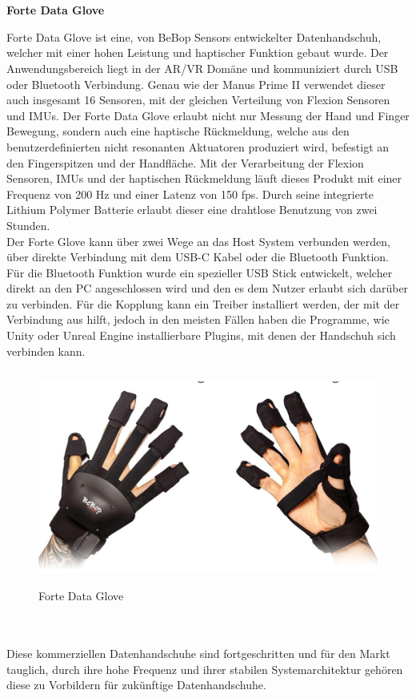 \\
\\
\begin{center}
\textbf{Forte Data Glove}
\end{center}
Forte Data Glove \parencite{web:BeBoP} ist eine, von BeBop Sensors entwickelter Datenhandschuh, welcher mit einer hohen Leistung und haptischer Funktion gebaut wurde. Der Anwendungsbereich liegt in der AR/VR Domäne und kommuniziert durch USB oder Bluetooth Verbindung. Genau wie der Manus Prime II verwendet dieser auch insgesamt 16 Sensoren, mit der gleichen Verteilung von Flexion Sensoren und IMUs. Der Forte Data Glove erlaubt nicht nur Messung der Hand und Finger Bewegung, sondern auch eine haptische Rückmeldung, welche aus den benutzerdefinierten nicht resonanten Aktuatoren produziert wird, befestigt an den Fingerspitzen und der Handfläche. Mit der Verarbeitung der Flexion Sensoren, IMUs und der haptischen Rückmeldung läuft dieses Produkt mit einer Frequenz von 200 Hz und einer Latenz von 150 fps. Durch seine integrierte Lithium Polymer Batterie erlaubt dieser eine drahtlose Benutzung von zwei Stunden.
\\
Der Forte Glove kann über zwei Wege an das Host System verbunden werden, über direkte Verbindung mit dem USB-C Kabel oder die Bluetooth Funktion. Für die Bluetooth Funktion wurde ein spezieller USB Stick entwickelt, welcher direkt an den PC angeschlossen wird und den es dem Nutzer erlaubt sich darüber zu verbinden. Für die Kopplung kann ein Treiber installiert werden, der mit der Verbindung aus hilft, jedoch in den meisten Fällen haben die Programme, wie Unity oder Unreal Engine installierbare Plugins, mit denen der Handschuh sich verbinden kann. 
\begin{figure}[h]
	\centering
    \includegraphics[height=200pt]{Bachelorarbeit/images/bebop_handschuh.jpg}
    \caption{Forte Data Glove}
    \label{fig:ForteDataGlove}
\end{figure}
\\
\\
Diese kommerziellen Datenhandschuhe sind fortgeschritten und für den Markt tauglich, durch ihre hohe Frequenz und ihrer stabilen Systemarchitektur gehören diese zu Vorbildern für zukünftige Datenhandschuhe.  
